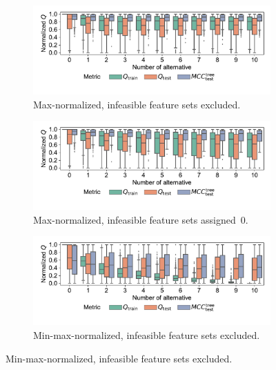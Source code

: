 \documentclass{article}
\theoremstyle{definition}
\begin{document}
\begin{figure}[p]
	\centering
	\begin{subfigure}[t]{\textwidth}
		\centering
		\includegraphics[width=\textwidth, trim=15 30 15 15, clip]{plots/impact-num-alternatives-quality-max.pdf}
		\caption{Max-normalized, infeasible feature sets excluded.}
		\label{fig:afs:impact-num-alternatives-quality-max}
	\end{subfigure}
	\begin{subfigure}[t]{\textwidth}
		\centering
		\includegraphics[width=\textwidth, trim=15 30 15 15, clip]{plots/impact-num-alternatives-quality-max-fillna.pdf}
		\caption{Max-normalized, infeasible feature sets assigned~0.}
		\label{fig:afs:impact-num-alternatives-quality-max-fillna}
	\end{subfigure}
	\begin{subfigure}[t]{\textwidth}
		\centering
		\includegraphics[width=\textwidth, trim=15 30 15 15, clip]{plots/impact-num-alternatives-quality-min-max.pdf}
		\caption{Min-max-normalized, infeasible feature sets excluded.}

\end{subfigure}
\end{figure}
\end{document}
